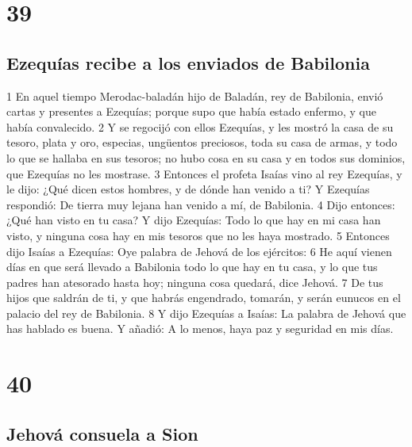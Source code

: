 \chapter{39}

\section*{Ezequías recibe a los enviados de Babilonia}

1 En aquel tiempo Merodac-baladán hijo de Baladán, rey de Babilonia, envió cartas y presentes a Ezequías; porque supo que había estado enfermo, y que había convalecido.
2 Y se regocijó con ellos Ezequías, y les mostró la casa de su tesoro, plata y oro, especias, ungüentos preciosos, toda su casa de armas, y todo lo que se hallaba en sus tesoros; no hubo cosa en su casa y en todos sus dominios, que Ezequías no les mostrase.
3 Entonces el profeta Isaías vino al rey Ezequías, y le dijo: ¿Qué dicen estos hombres, y de dónde han venido a ti? Y Ezequías respondió: De tierra muy lejana han venido a mí, de Babilonia.
4 Dijo entonces: ¿Qué han visto en tu casa? Y dijo Ezequías: Todo lo que hay en mi casa han visto, y ninguna cosa hay en mis tesoros que no les haya mostrado.
5 Entonces dijo Isaías a Ezequías: Oye palabra de Jehová de los ejércitos:
6 He aquí vienen días en que será llevado a Babilonia todo lo que hay en tu casa, y lo que tus padres han atesorado hasta hoy; ninguna cosa quedará, dice Jehová.
7 De tus hijos que saldrán de ti, y que habrás engendrado, tomarán, y serán eunucos en el palacio del rey de Babilonia. 
8 Y dijo Ezequías a Isaías: La palabra de Jehová que has hablado es buena. Y añadió: A lo menos, haya paz y seguridad en mis días.

\chapter{40}

\section*{Jehová consuela a Sion}

